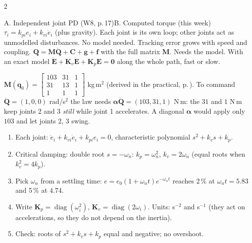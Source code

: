 \begin{multicols}{2}
\begin{twoway}{A. Independent joint PD (W8, p.\,17)}{B. Computed torque (this week)}
$\tau_i=k_{pi}e_i+k_{vi}\dot e_i$ (plus gravity). Each joint is its own loop; other joints act as unmodelled disturbances. No model needed. Tracking error grows with speed and coupling.
\tcblower
$\mathbf Q=\mathbf M\acute{\mathbf Q}+\mathbf C+\mathbf g+\mathbf f$ with the full matrix $\mathbf M$. Needs the model. With an exact model $\ddot{\mathbf E}+\mathbf K_v\dot{\mathbf E}+\mathbf K_p\mathbf E=\mathbf 0$ along the whole path, fast or slow.
\end{twoway}
\begin{worked}[$\boldsymbol\alpha$ is not diagonal: practical 3-link arm at $\mathbf q_0=(0,0,90^\circ)$]
$\mathbf M(\mathbf q_0)=\begin{bmatrix}103&31&1\\31&13&1\\1&1&1\end{bmatrix}$ kg\,m$^2$ (derived in the practical, p.\,\pageref{w9:prac}). To command $\acute{\mathbf Q}=(1,0,0)$ rad/s$^2$ the law needs $\boldsymbol\alpha\acute{\mathbf Q}=(103,31,1)$ N\,m: the $31$ and $1$ N\,m keep joints 2 and 3 \emph{still} while joint 1 accelerates. A diagonal $\boldsymbol\alpha$ would apply only $103$ and let joints 2, 3 swing. \chk
\end{worked}
\begin{recipe}\label{w9:gain}
\begin{enumerate}
\item Each joint: $\ddot e_i+k_{vi}\dot e_i+k_{pi}e_i=0$, characteristic polynomial $s^2+k_vs+k_p$.
\item Critical damping: double root $s=-\omega_n$: $k_p=\omega_n^2$, $k_v=2\omega_n$ (equal roots when $k_v^2=4k_p$).
\item Pick $\omega_n$ from a settling time: $e=e_0(1+\omega_nt)e^{-\omega_nt}$ reaches 2\,\% at $\omega_nt=5.83$ and 5\,\% at $4.74$. \chk
\item Write $\mathbf K_p=\operatorname{diag}(\omega_i^2)$, $\mathbf K_v=\operatorname{diag}(2\omega_i)$. Units: s$^{-2}$ and s$^{-1}$ (they act on accelerations, so they do not depend on the inertia).
\item Check: roots of $s^2+k_vs+k_p$ equal and negative; no overshoot.
\end{enumerate}
\end{recipe}
\begin{worked}

\end{worked}
\end{multicols}

